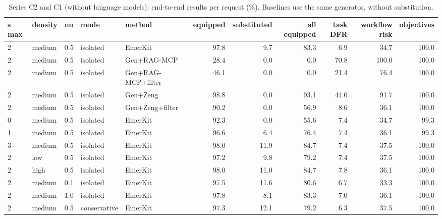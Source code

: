 \begin{table}[!ht]\centering\caption{Series C2 and C1 (without language models): end-to-end results per request (\%). Baselines use the same generator, without substitution.}\label{tab:c2}\scriptsize
\begin{tabular}{lllllrrrrrr}\toprule
s max & density & nu & mode & method & equipped & substituted & all equipped & task DFR & workflow risk & objectives \\ \midrule
2 & medium & 0.5 & isolated & EmerKit & 97.8 & 9.7 & 83.3 & 6.9 & 34.7 & 100.0 \\
2 & medium & 0.5 & isolated & Gen+RAG-MCP & 28.4 & 0.0 & 0.0 & 70.8 & 100.0 & 100.0 \\
2 & medium & 0.5 & isolated & Gen+RAG-MCP+filter & 46.1 & 0.0 & 0.0 & 21.4 & 76.4 & 100.0 \\
2 & medium & 0.5 & isolated & Gen+Zeng & 98.8 & 0.0 & 93.1 & 44.0 & 91.7 & 100.0 \\
2 & medium & 0.5 & isolated & Gen+Zeng+filter & 90.2 & 0.0 & 56.9 & 8.6 & 36.1 & 100.0 \\
0 & medium & 0.5 & isolated & EmerKit & 92.3 & 0.0 & 55.6 & 7.4 & 34.7 & 99.3 \\
1 & medium & 0.5 & isolated & EmerKit & 96.6 & 6.4 & 76.4 & 7.4 & 36.1 & 99.3 \\
3 & medium & 0.5 & isolated & EmerKit & 98.0 & 11.9 & 84.7 & 7.4 & 37.5 & 100.0 \\
2 & low & 0.5 & isolated & EmerKit & 97.2 & 9.8 & 79.2 & 7.4 & 37.5 & 100.0 \\
2 & high & 0.5 & isolated & EmerKit & 98.0 & 11.0 & 84.7 & 7.8 & 36.1 & 100.0 \\
2 & medium & 0.1 & isolated & EmerKit & 97.5 & 11.6 & 80.6 & 6.7 & 33.3 & 100.0 \\
2 & medium & 1.0 & isolated & EmerKit & 97.8 & 8.1 & 83.3 & 7.0 & 36.1 & 100.0 \\
2 & medium & 0.5 & conservative & EmerKit & 97.3 & 12.1 & 79.2 & 6.3 & 37.5 & 100.0 \\
\bottomrule\end{tabular}\end{table}
